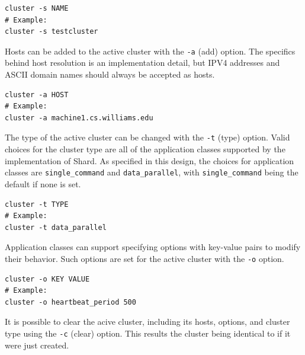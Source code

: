 \documentclass[twoside]{report}
\begin{document}
\begin{minipage}[c]{\textwidth-15pt}
  \begin{lstlisting}[language=Shard]
cluster -s NAME
# Example:
cluster -s testcluster
\end{lstlisting}
  \smallskip
\end{minipage}

Hosts can be added to the active cluster with the \texttt{-a} (add) option.
The specifics behind host resolution is an implementation detail, but IPV4 addresses and ASCII domain names should always be accepted as hosts.

\begin{minipage}[c]{\textwidth-15pt}
  \begin{lstlisting}[language=Shard]
cluster -a HOST
# Example:
cluster -a machine1.cs.williams.edu
\end{lstlisting}
  \smallskip
\end{minipage}

The type of the active cluster can be changed with the \texttt{-t} (type) option.
Valid choices for the cluster type are all of the application classes supported by the implementation of Shard.
As specified in this design, the choices for application classes are \texttt{single\_command} and \texttt{data\_parallel}, with \texttt{single\_command} being the default if none is set.

\begin{minipage}[c]{\textwidth-15pt}
  \begin{lstlisting}[language=Shard]
cluster -t TYPE
# Example:
cluster -t data_parallel
\end{lstlisting}
  \smallskip
\end{minipage}

Application classes can support specifying options with key-value pairs to modify their behavior. Such options are set for the active cluster with the \texttt{-o} option.

\begin{minipage}[c]{\textwidth-15pt}
  \begin{lstlisting}[language=Shard]
cluster -o KEY VALUE
# Example:
cluster -o heartbeat_period 500
\end{lstlisting}
  \smallskip
\end{minipage}

It is possible to clear the acive cluster, including its hosts, options, and cluster type using the \texttt{-c} (clear) option.
This results the cluster being identical to if it were just created.
\end{document}
